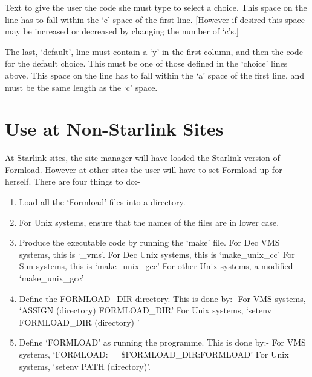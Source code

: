 Text to give the user the code she must type to select a choice. This space
on the line has to fall within the `c' space of the first line. [However if
desired this space may be increased or decreased by changing the number of
`c's.] 

The last, `default', line must contain a `y' in the first column, and then
the code for the default choice. This must be one of those defined in the
`choice' lines above. This space on the line has to fall within the `a'
space of the first line, and must be the same length as the `c' space. 


\section{Use at Non-Starlink Sites}

At Starlink sites, the site manager will have loaded the Starlink version
of Formload. However at other sites the user will have to set Formload up
for herself. There are four things to do:- 

\begin{enumerate}

\item  Load all the `Formload' files into a directory. 

\item  For Unix systems, ensure that the names of the files are in 
       lower case.

\item  Produce the executable code by running the `make' file. \newline
       \hspace*{1cm} For Dec VMS systems, this is `\@make\_vms'. \newline
       \hspace*{1cm} For Dec Unix systems, this is `make\_unix\_cc'  \newline
       \hspace*{1cm} For Sun systems, this is `make\_unix\_gcc'  \newline
       \hspace*{1cm} For other Unix systems, a modified `make\_unix\_gcc' 
            

\item  Define the FORMLOAD\_DIR directory. This is done by:- \newline
       \hspace*{1cm} For VMS systems, `ASSIGN (directory) FORMLOAD\_DIR'
       \newline \hspace*{1cm} For Unix systems, `setenv FORMLOAD\_DIR
        (directory) '

\item Define `FORMLOAD' as running the programme. This is done by:- \newline
       \hspace*{1cm} For VMS systems, `FORMLOAD:==\$FORMLOAD\_DIR:FORMLOAD'
       \newline \hspace*{1cm} For Unix systems, `setenv PATH (directory)'.

\end{enumerate}

